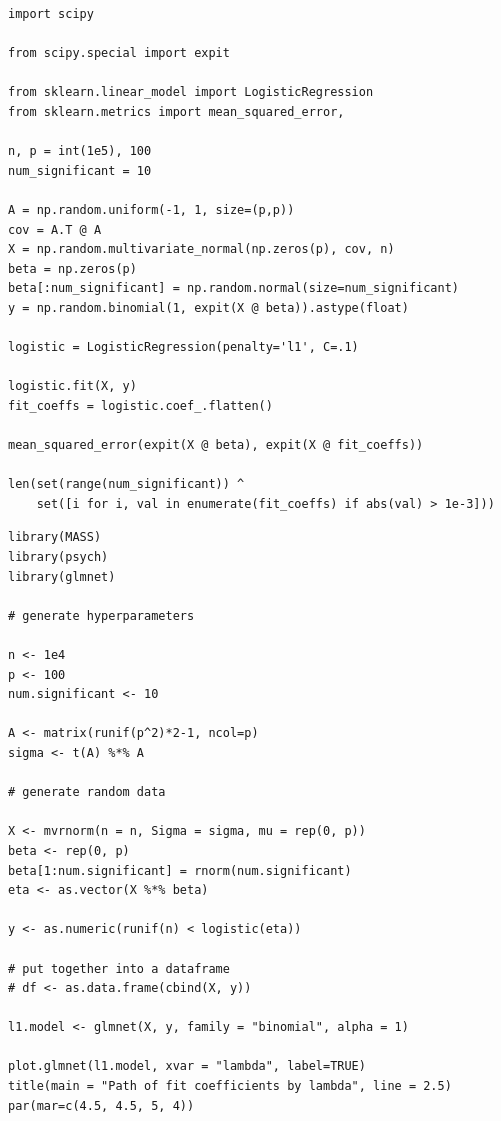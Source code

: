 \documentclass[letterpaper, 12pt]{article}
\begin{document}
\begin{lstlisting}
import scipy

from scipy.special import expit

from sklearn.linear_model import LogisticRegression
from sklearn.metrics import mean_squared_error, 

n, p = int(1e5), 100
num_significant = 10

A = np.random.uniform(-1, 1, size=(p,p))
cov = A.T @ A
X = np.random.multivariate_normal(np.zeros(p), cov, n)
beta = np.zeros(p)
beta[:num_significant] = np.random.normal(size=num_significant)
y = np.random.binomial(1, expit(X @ beta)).astype(float)

logistic = LogisticRegression(penalty='l1', C=.1)

logistic.fit(X, y)
fit_coeffs = logistic.coef_.flatten()

mean_squared_error(expit(X @ beta), expit(X @ fit_coeffs))

len(set(range(num_significant)) ^ 
    set([i for i, val in enumerate(fit_coeffs) if abs(val) > 1e-3]))
\end{lstlisting}

\begin{lstlisting}
library(MASS)
library(psych)
library(glmnet)

# generate hyperparameters

n <- 1e4
p <- 100
num.significant <- 10

A <- matrix(runif(p^2)*2-1, ncol=p) 
sigma <- t(A) %*% A

# generate random data

X <- mvrnorm(n = n, Sigma = sigma, mu = rep(0, p))
beta <- rep(0, p)
beta[1:num.significant] = rnorm(num.significant)
eta <- as.vector(X %*% beta)

y <- as.numeric(runif(n) < logistic(eta))

# put together into a dataframe
# df <- as.data.frame(cbind(X, y))

l1.model <- glmnet(X, y, family = "binomial", alpha = 1)

plot.glmnet(l1.model, xvar = "lambda", label=TRUE)
title(main = "Path of fit coefficients by lambda", line = 2.5)
par(mar=c(4.5, 4.5, 5, 4))
\end{lstlisting}
\end{document}
